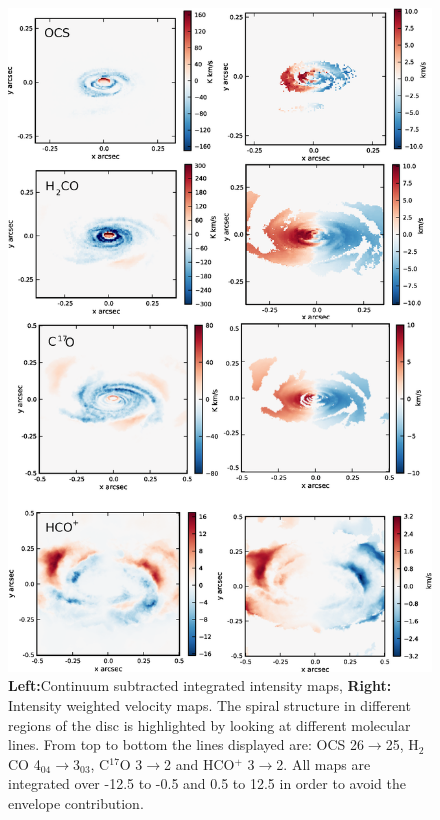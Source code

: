 \documentclass[useAMS,usenatbib]{mn2e}
\begin{document}
\begin{figure}
 \includegraphics[width=150mm]{Figures/sim/imageALL_30deg_all.eps}
 \caption{{\bf Left:}Continuum subtracted integrated intensity maps, {\bf Right:} Intensity weighted velocity maps. The spiral structure in different regions of the disc is highlighted by looking at different molecular lines. From top to bottom the lines displayed are: OCS 26$\rightarrow$25, H$_2$CO 4$_{04}$$\rightarrow$3$_{03}$, C$^{17}$O 3$\rightarrow$2 and HCO$^+$ 3$\rightarrow$2. All maps are integrated over -12.5 to -0.5 and 0.5 to 12.5 in order to avoid the envelope contribution.}
 \label{sim_all}
\end{figure}
\end{document}
